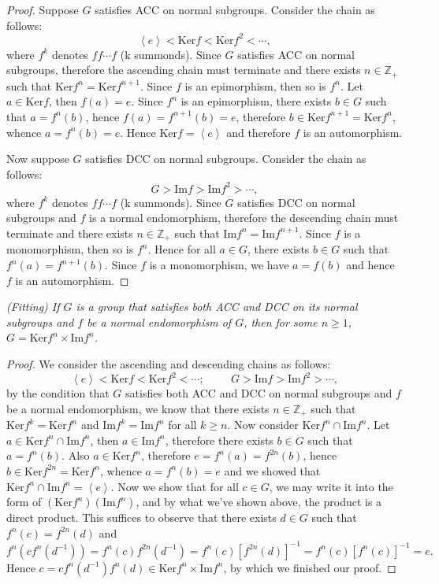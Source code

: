 \begin{proof}
Suppose $G$ satisfies ACC on normal subgroups. Consider the chain as follows:
$$
\left< e \right> <\mathrm{Ker}f<\mathrm{Ker}f^2<\cdots ,
$$
where $f^k$ denotes $ff\cdots f$ (k summonds). Since $G$ satisfies ACC on normal subgroups, therefore the ascending chain must terminate and there exists $n\in\mathbb{Z}_+$ such that $\mathrm{Ker}f^n=\mathrm{Ker}f^{n+1}$. Since $f$ is an epimorphism, then so is $f^n$. Let $a\in\mathrm{Ker}f$, then $f(a)=e$. Since $f^n$ is an epimorphism, there exists $b\in G$ such that $a=f^n(b)$, hence $f(a)=f^{n+1}(b)=e$, therefore $b\in\mathrm{Ker}f^{n+1}=\mathrm{Ker}f^n$, whence $a=f^n(b)=e$. Hence $\mathrm{Ker}f=\left<e\right>$ and therefore $f$ is an automorphism.\par
Now suppose $G$ satisfies DCC on normal subgroups. Consider the chain as follows:
$$
G>\mathrm{Im}f>\mathrm{Im}f^2>\cdots ,
$$
where $f^k$ denotes $ff\cdots f$ (k summonds). Since $G$ satisfies DCC on normal subgroups and $f$ is a normal endomorphism, therefore the descending chain must terminate and there exists $n\in\mathbb{Z}_+$ such that $\mathrm{Im}f^n=\mathrm{Im}f^{n+1}$. Since $f$ is a monomorphism, then so is $f^n$. Hence for all $a\in G$, there exists $b\in G$ such that $f^n(a)=f^{n+1}(b)$. Since $f$ is a monomorphism, we have $a=f(b)$ and hence $f$ is an automorphism.
\end{proof}
\begin{lemma}\em
(Fitting)
If $G$ is a group that satisfies both ACC and DCC on its normal subgroups and $f$ be a normal endomorphism of $G$, then for some $n\ge 1$, $G=\mathrm{Ker}f^n\times\mathrm{Im}f^n$.
\end{lemma}
\begin{proof}
We consider the ascending and descending chains as follows:
$$
\left< e \right> <\mathrm{Ker}f<\mathrm{Ker}f^2<\cdots ;\hspace{1cm}G>\mathrm{Im}f>\mathrm{Im}f^2>\cdots ,
$$
by the condition that $G$ satisfies both ACC and DCC on normal subgroups and $f$ be a normal endomorphism, we know that there exists $n\in\mathbb{Z}_+$ such that $\mathrm{Ker}f^k=\mathrm{Ker}f^n$ and $\mathrm{Im}f^k=\mathrm{Im}f^n$ for all $k\ge n$. Now consider $\mathrm{Ker}f^n\cap\mathrm{Im}f^n$. Let $a\in\mathrm{Ker}f^n\cap\mathrm{Im}f^n$, then $a\in\mathrm{Im}f^n$, therefore there exists $b\in G$ such that $a=f^n(b)$. Also $a\in\mathrm{Ker}f^n$, therefore $e=f^n(a)=f^{2n}(b)$, hence $b\in\mathrm{Ker}f^{2n}=\mathrm{Ker}f^n$, whence $a=f^n(b)=e$ and we showed that $\mathrm{Ker}f^n\cap\mathrm{Im}f^n=\left<e\right>$. Now we show that for all $c\in G$, we may write it into the form of $(\mathrm{Ker}f^n)(\mathrm{Im}f^n)$, and by what we've shown above, the product is a direct product. This suffices to observe that there exists $d\in G$ such that $f^n(c)=f^{2n}(d)$ and 
$$
f^n\left( cf^n\left( d^{-1} \right) \right) =f^n\left( c \right) f^{2n}\left( d^{-1} \right) =f^n\left( c \right) \left[ f^{2n}\left( d \right) \right] ^{-1}=f^n\left( c \right) \left[ f^n\left( c \right) \right] ^{-1}=e.
$$
Hence $c=cf^n\left( d^{-1} \right) f^n\left( d \right) \in \mathrm{Ker}f^n\times \mathrm{Im}f^n$, by which we finished our proof.
\end{proof}
